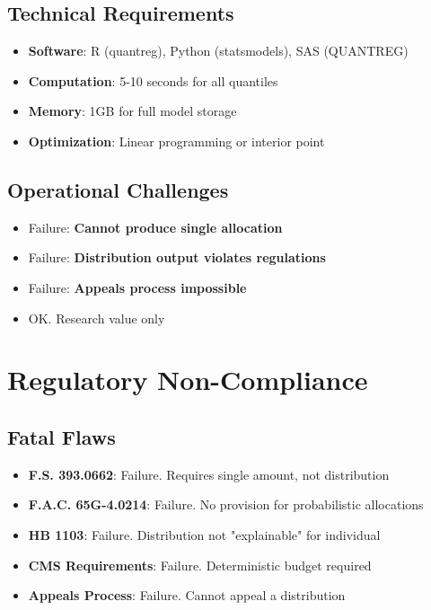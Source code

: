 \subsection{Technical Requirements}

\begin{itemize}
    \item \textbf{Software}: R (quantreg), Python (statsmodels), SAS (QUANTREG)
    \item \textbf{Computation}: 5-10 seconds for all quantiles
    \item \textbf{Memory}: 1GB for full model storage
    \item \textbf{Optimization}: Linear programming or interior point
\end{itemize}

\subsection{Operational Challenges}

\begin{itemize}
    \item Failure:  \textbf{Cannot produce single allocation}
    \item Failure:  \textbf{Distribution output violates regulations}
    \item Failure:  \textbf{Appeals process impossible}
    \item OK.  Research value only
\end{itemize}

\section{Regulatory Non-Compliance}

\subsection{Fatal Flaws}

\begin{itemize}
    \item \textbf{F.S. 393.0662}: Failure.  Requires single amount, not distribution
    \item \textbf{F.A.C. 65G-4.0214}: Failure.  No provision for probabilistic allocations
    \item \textbf{HB 1103}: Failure.  Distribution not "explainable" for individual
    \item \textbf{CMS Requirements}: Failure.  Deterministic budget required
    \item \textbf{Appeals Process}: Failure.  Cannot appeal a distribution
\end{itemize}


